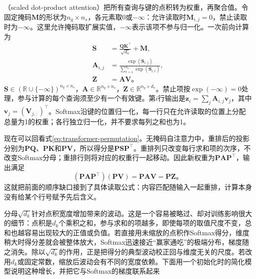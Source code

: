 （scaled dot-product attention）把所有查询与键的点积转为权重，再聚合值。令固定掩码$\bm M$的形状为$n_q\times n_s$，各元素取$0$或$-\infty$：允许读取时$\bm M_{i,j}=0$，禁止读取时为$-\infty$。这里允许掩码取扩展实值，$-\infty$表示该项不参与归一化。一次前向计算为
\begin{equation}
  \begin{aligned}
    \bm S&=\frac{\bm Q\bm K^{\top}}{\sqrt{d_k}}+\bm M,\\
    \bm A_{i,j}&=\frac{\exp(\bm S_{i,j})}
      {\sum_{t=1}^{n_s}\exp(\bm S_{i,t})},\\
    \bm Z&=\bm A\bm V\text{。}
  \end{aligned}
  \label{eq:transformer-attention}
\end{equation}
$\bm S\in(\mathbb R\cup\{-\infty\})^{n_q\times n_s}$，$\bm A\in\mathbb R^{n_q\times n_s}$，$\bm Z\in\mathbb R^{n_q\times d_v}$。禁止项按$\exp(-\infty)=0$处理，参与计算的每个查询须至少有一个有效键。第$i$行输出是$\bm z_i=\sum_j\bm A_{i,j}\bm v_j$，其中$\bm v_j=(\bm V_{j,:})^{\top}$。Softmax沿键的位置归一化，每一行只在允许读取的位置上分配总量为1的权重；各行独立归一化，并不要求每列之和也为1。

现在可以回看式\eqref{eq:transformer-permutation}。无掩码自注意力中，重排后的投影分别为$\bm P\bm Q$、$\bm P\bm K$和$\bm P\bm V$，所以得分是$\bm P\bm S\bm P^{\top}$。重排列只改变每行求和项的次序，不改变Softmax分母；重排行则将对应的权重行一起移动。因此新权重为$\bm P\bm A\bm P^{\top}$，输出满足
\[
  (\bm P\bm A\bm P^{\top})(\bm P\bm V)
     =\bm P\bm A\bm V=\bm P\bm Z\text{。}
\]
这就把前面的顺序缺口接到了具体读取公式：内容匹配随输入一起重排，计算本身没有给某个行号赋予先后含义。

分母$\sqrt{d_k}$针对点积宽度增加带来的波动。这是一个容易被略过、却对训练影响很大的细节：点积是$d_k$个乘积之和，参与求和的项越多，即使每项的取值尺度不变，总和也越容易出现较大的正值或负值。若直接用未缩放的点积作Softmax得分，维度稍大时得分差就会被整体放大，Softmax迅速接近“赢家通吃”的极端分布，梯度随之消失。除以$\sqrt{d_k}$的作用，正是把得分的典型波动校正回与维度无关的尺度。若改用$d_k$或固定常数，缩放后波动会有不同的宽度依赖。下面用一个初始化时的简化模型说明这种增长，并把它与Softmax的梯度联系起来

